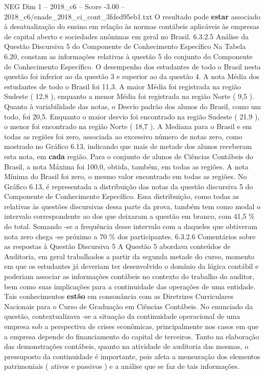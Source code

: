 \begin{textsample}{NEG Dim 1 – 2018\_c6 – Score -3.00 – 2018\_c6/enade\_2018\_ci\_cont\_3fded95eb1.txt}
O resultado pode \textbf{estar} associado à desatualização do ensino em relação às normas contábeis aplicáveis às empresas de capital aberto e sociedades anônimas em geral no Brasil. 6.3.2.5 Análise da Questão Discursiva 5 do Componente de Conhecimento Específico Na Tabela 6.20, constam as informações relativas à questão 5 do conjunto do Componente de Conhecimento Específico.
O desempenho dos estudantes de todo o Brasil nesta questão foi inferior ao da questão 3 e superior ao da questão 4.
A nota Média dos estudantes de todo o Brasil foi 11,3.
A maior Média foi registrada na região Sudeste ( 12,8 ), enquanto a menor Média foi registrada na região Norte ( 9,5 ).
Quanto à variabilidade das notas, o Desvio padrão dos alunos do Brasil, como um todo, foi 20,5.
Enquanto o maior desvio foi encontrado na região Sudeste ( 21,9 ), o menor foi encontrado na região Norte ( 18,7 ).
A Mediana para o Brasil e em todas as regiões foi zero, associada ao excessivo número de notas zero, como mostrado no Gráfico 6.13, indicando que mais de metade dos alunos receberam esta nota, em \textbf{cada} região.
Para o conjunto de alunos de Ciências Contábeis do Brasil, a nota Máxima foi 100,0, obtida, também, em todas as regiões.
A nota Mínima do Brasil foi zero, o mesmo valor encontrado em todas as regiões.
No Gráfico 6.13, é representada a distribuição das notas da questão discursiva 5 do Componente de Conhecimento Específico.
Essa distribuição, como todas as relativas às questões discursivas dessa parte da prova, também tem como modal o intervalo correspondente ao dos que deixaram a questão em branco, com 41,5 \% do total.
Somando -se a frequência desse intervalo com a daqueles que obtiveram nota zero chega -se próximo a 70 \% dos participantes. 6.3.2.6 Comentários sobre as respostas à Questão Discursiva 5 A Questão 5 abordava conteúdos de Auditoria, em geral trabalhados a partir da segunda metade do curso, momento em que os estudantes já deveriam ter desenvolvido o domínio da lógica contábil e poderiam associar as informações contábeis no contexto do trabalho do auditor, bem como suas implicações para a continuidade das operações de uma entidade.
Tais conhecimentos \textbf{estão} em consonância com as Diretrizes Curriculares Nacionais para o Curso de Graduação em Ciências Contábeis.
No enunciado da questão, contextualizava -se a situação da continuidade operacional de uma empresa sob a perspectiva de crises econômicas, principalmente nos casos em que a empresa depende do financiamento do capital de terceiros.
Tanto na elaboração das demonstrações contábeis, quanto na atividade de auditoria das mesmas, o pressuposto da continuidade é importante, pois afeta a mensuração dos elementos patrimoniais ( ativos e passivos ) e a análise que se faz de tais informações.

\end{textsample}
